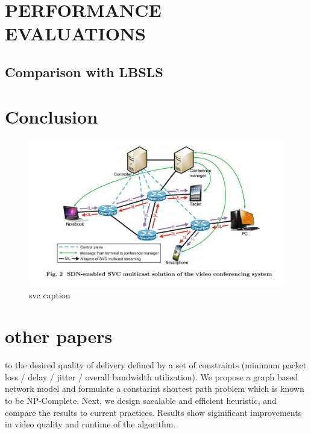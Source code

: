 \documentclass[a4paper, 10pt, conference]{ieeeconf}
\begin{document}
\section{PERFORMANCE EVALUATIONS}

\subsection{Comparison with LBSLS}
\subsection{}

\section{Conclusion}

\newpage
\begin{figure}[htbp]
\centering
\includegraphics[scale=0.45]{svc-sdn-video-conf.jpg}
\caption{svc caption}
\label{svc label}
\end{figure}

\addtolength{\textheight}{-12cm}




\section{other papers}
to the desired quality of delivery defined by a set of constraints (minimum
packet loss / delay / jitter / overall bandwidth utilization). We propose
a graph based network model and formulate a constarint shortest path
problem which is known to be NP-Complete. Next, we design sacalable
and efficient heuristic, and compare the results to current practices. Results
show siginificant improvements in video quality and runtime of the
algorithm.
\end{document}
